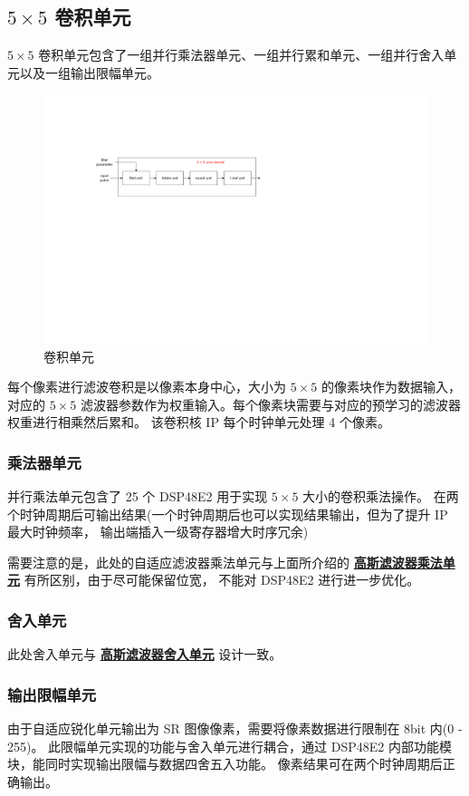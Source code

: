 \documentclass[12pt, a4paper, oneside]{ctexbook}
\begin{document}
	\subsection{$5\times5$ 卷积单元}
	$5\times5$ 卷积单元包含了一组并行乘法器单元、一组并行累和单元、一组并行舍入单元以及一组输出限幅单元。
	\begin{figure}[h]
		\centering
		\includegraphics[scale=0.7]{pic/conv.pdf}
		\caption{卷积单元}
	\end{figure}	
	每个像素进行滤波卷积是以像素本身中心，大小为 $5\times5$ 的像素块作为数据输入，
	对应的 $5\times5$ 滤波器参数作为权重输入。每个像素块需要与对应的预学习的滤波器权重进行相乘然后累和。
	该卷积核 IP 每个时钟单元处理 4 个像素。
	\subsubsection{乘法器单元}
	并行乘法单元包含了 25 个 DSP48E2 用于实现 $5\times5$ 大小的卷积乘法操作。
	在两个时钟周期后可输出结果(一个时钟周期后也可以实现结果输出，但为了提升 IP 最大时钟频率，
	输出端插入一级寄存器增大时序冗余) \par 需要注意的是，此处的自适应滤波器乘法单元与上面所介绍的 
	\hyperref[mul_unit]{\textbf{高斯滤波器乘法单元}} 有所区别，由于尽可能保留位宽，
	不能对 DSP48E2 进行进一步优化。%
	\subsubsection{舍入单元}
	此处舍入单元与 \hyperref[round_unit]{\textbf{高斯滤波器舍入单元}} 设计一致。		
	\subsubsection{输出限幅单元}
	由于自适应锐化单元输出为 SR 图像像素，需要将像素数据进行限制在 8bit 内(0 - 255)。
	此限幅单元实现的功能与舍入单元进行耦合，通过 DSP48E2 内部功能模块，能同时实现输出限幅与数据四舍五入功能。
	像素结果可在两个时钟周期后正确输出。
\end{document}
